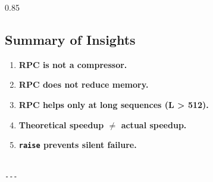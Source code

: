 0.85

\subsection{Summary of Insights}

\begin{enumerate}
\item \textbf{RPC is not a compressor.}
\item \textbf{RPC does not reduce memory.}
\item \textbf{RPC helps only at long sequences (L \textgreater{} 512).}
\item \textbf{Theoretical speedup $\ne$ actual speedup.}
\item \textbf{\texttt{raise} prevents silent failure.}
\end{enumerate}
\begin{lstlisting}

---
\end{lstlisting}